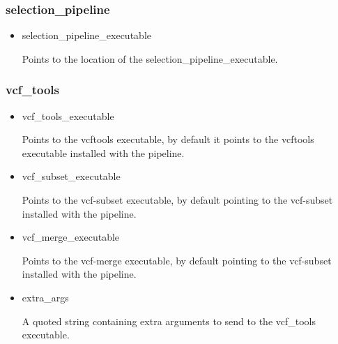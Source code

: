 \documentclass[a4paper,10pt]{article}
\begin{document}
                             \subsubsection{selection\_pipeline}
                             \begin{itemize}
                             \item selection\_pipeline\_executable

                             Points to the location of the selection\_pipeline\_executable. 
                             \end{itemize}
                             \subsubsection{vcf\_tools}
                             \begin{itemize}
                             \item vcf\_tools\_executable 

                             Points to the vcftools executable, by default it points to the
                             vcftools executable installed with the pipeline.
                             \item vcf\_subset\_executable 

                             Points to the vcf-subset executable, by default pointing to the
                             vcf-subset installed with the pipeline.
                             \item vcf\_merge\_executable

                             Points to the vcf-merge executable, by default pointing to the
                             vcf-subset installed with the pipeline.
                             \item extra\_args 

                             A quoted string containing extra arguments to send to the vcf\_tools executable.
                             \end{itemize}
\end{document}
